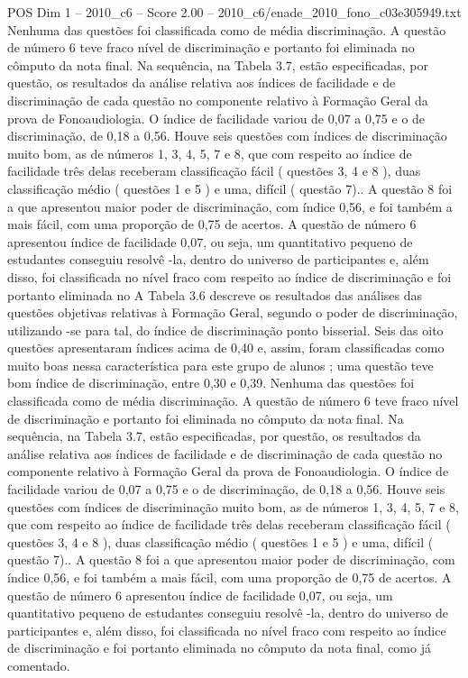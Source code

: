 \begin{textsample}{POS Dim 1 – 2010\_c6 – Score 2.00 – 2010\_c6/enade\_2010\_fono\_c03e305949.txt}
Nenhuma das questões foi classificada como de média discriminação.
A questão de número 6 teve fraco nível de discriminação e portanto foi eliminada no cômputo da nota final.
Na sequência, na Tabela 3.7, estão especificadas, por questão, os resultados da análise relativa aos índices de facilidade e de discriminação de cada questão no componente relativo à Formação Geral da prova de Fonoaudiologia.
O índice de facilidade variou de 0,07 a 0,75 e o de discriminação, de 0,18 a 0,56.
Houve seis questões com índices de discriminação muito bom, as de números 1, 3, 4, 5, 7 e 8, que com respeito ao índice de facilidade três delas receberam classificação fácil ( questões 3, 4 e 8 ), duas classificação médio ( questões 1 e 5 ) e uma, difícil ( questão 7)..
A questão 8 foi a que apresentou maior poder de discriminação, com índice 0,56, e foi também a mais fácil, com uma proporção de 0,75 de acertos.
A questão de número 6 apresentou índice de facilidade 0,07, ou seja, um quantitativo pequeno de estudantes conseguiu resolvê -la, dentro do universo de participantes e, além disso, foi classificada no nível fraco com respeito ao índice de discriminação e foi portanto eliminada no A Tabela 3.6 descreve os resultados das análises das questões objetivas relativas à Formação Geral, segundo o poder de discriminação, utilizando -se para tal, do índice de discriminação ponto bisserial.
Seis das oito questões apresentaram índices acima de 0,40 e, assim, foram classificadas como muito boas nessa característica para este grupo de alunos ; uma questão teve bom índice de discriminação, entre 0,30 e 0,39.
Nenhuma das questões foi classificada como de média discriminação.
A questão de número 6 teve fraco nível de discriminação e portanto foi eliminada no cômputo da nota final.
Na sequência, na Tabela 3.7, estão especificadas, por questão, os resultados da análise relativa aos índices de facilidade e de discriminação de cada questão no componente relativo à Formação Geral da prova de Fonoaudiologia.
O índice de facilidade variou de 0,07 a 0,75 e o de discriminação, de 0,18 a 0,56.
Houve seis questões com índices de discriminação muito bom, as de números 1, 3, 4, 5, 7 e 8, que com respeito ao índice de facilidade três delas receberam classificação fácil ( questões 3, 4 e 8 ), duas classificação médio ( questões 1 e 5 ) e uma, difícil ( questão 7)..
A questão 8 foi a que apresentou maior poder de discriminação, com índice 0,56, e foi também a mais fácil, com uma proporção de 0,75 de acertos.
A questão de número 6 apresentou índice de facilidade 0,07, ou seja, um quantitativo pequeno de estudantes conseguiu resolvê -la, dentro do universo de participantes e, além disso, foi classificada no nível fraco com respeito ao índice de discriminação e foi portanto eliminada no cômputo da nota final, como já comentado.

\end{textsample}
